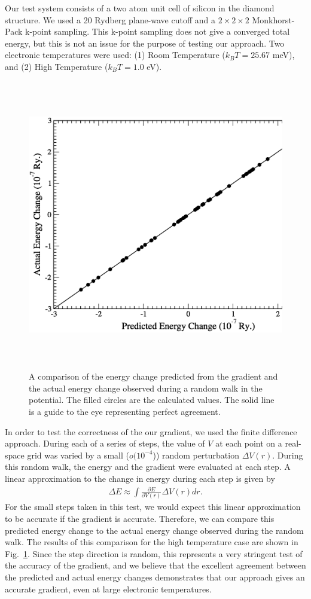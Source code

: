 \documentclass{article}
\newcommand{\bea}{\begin{eqnarray}} \newcommand{\ena}{\end{eqnarray}}
\newcommand{\Vscp}{V}
\begin{document}
Our test system consists of a two atom unit cell of silicon in the diamond structure.  We used a
20 Rydberg plane-wave cutoff and a $2 \times 2 \times 2$ Monkhorst-Pack k-point sampling.
This k-point sampling does not give a converged total energy, but this is not an issue for
the purpose of testing our approach.  Two electronic temperatures were used: (1) Room Temperature
($k_B T = 25.67$ meV), and (2) High Temperature ($k_B T = 1.0$ eV).

\begin{figure}[p]
\includegraphics[height=5in]{Figure_1.ps}
\caption{A comparison of the energy change predicted from the gradient
and the actual energy change observed during a random walk in the
potential.  The filled circles are the calculated values.  The solid
line is a guide to the eye representing perfect agreement.}
\label{fd_test}
\end{figure}

In order to test the correctness of the our gradient, we used the finite difference approach.
During each of a series of steps, the value of $\Vscp$ at each point on a real-space grid was
varied by a small ($o(10^{-4}$)) random perturbation $\Delta V(r)$.  During this random walk, the
energy and the gradient were evaluated at each step.  A linear approximation to the change
in energy during each step is given by
\bea
  \Delta E \approx \int{\frac{\partial E}{\partial V(r)} \Delta V(r) dr}.
\ena
For the small steps taken in this test, we would expect this linear approximation to be accurate if
the gradient is accurate.  Therefore, we can compare this predicted energy change to the actual
energy change observed during the random walk.  The results of this comparison for the high
temperature case are shown in Fig.~\ref{fd_test}.  Since the step direction is random,
this represents a very stringent test of the accuracy of the gradient, and we believe that
the excellent agreement between the predicted and actual energy changes demonstrates
that our approach gives an accurate gradient, even at large electronic temperatures.
\end{document}
